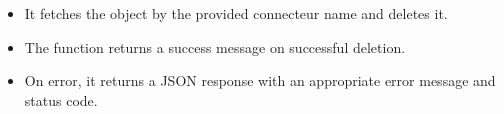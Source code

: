 \documentclass[letterpaper,10pt,english]{sphinxmanual}
\begin{document}
\begin{fulllineitems}
\begin{description}
\begin{itemize}
\item {} 
\sphinxAtStartPar
It fetches the  object by the provided connecteur name and deletes it.

\item {} 
\sphinxAtStartPar
The function returns a success message on successful deletion.

\item {} 
\sphinxAtStartPar
On error, it returns a JSON response with an appropriate error message and status code.

\end{itemize}

\end{description}

\end{fulllineitems}

\end{document}
